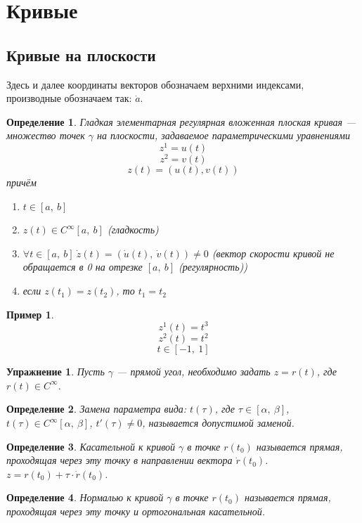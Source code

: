 \documentclass[12pt]{article}
\theoremstyle{plain}
\newtheorem*{exercise}{Упражнение}
\newtheorem{example}{Пример}
\newtheorem{definition}{Определение}[section]
\begin{document}
    \tableofcontents
    \fontsize{14pt}{20pt}\selectfont
    \section{Кривые}
    \subsection{Кривые на плоскости}
    Здесь и далее координаты векторов обозначаем верхними индексами, производные обозначаем так: $\dot{a}$.
    \begin{definition}
        Гладкая элементарная регулярная вложенная плоская кривая --- множество точек $\gamma$ на плоскости, задаваемое параметрическими уравнениями
        $$z^1=u(t)$$
        $$z^2=v(t)$$
        $$z(t)=(u(t),v(t))$$
        причём
        \begin{enumerate}
            \item $t\in[a, \ b]$
            \item $z(t)\in C^{\infty}[a,\ b]$ (гладкость)
            \item $\forall t\in[a, \ b] \ \dot{z}(t)=(\dot{u}(t), \ \dot{v}(t))\neq0$ (вектор скорости кривой не обращается в 0 на отрезке $[a, \ b]$ (регулярность))
            \item если $z(t_1)=z(t_2)$, то $t_1=t_2$
        \end{enumerate}
    \end{definition}
    \begin{example}
        $$z^1(t)=t^3$$
        $$z^2(t)=t^2$$
        $$t\in[-1, \ 1]$$
        
    \end{example}
    \begin{exercise}
        Пусть $\gamma$ --- прямой угол, необходимо задать $z=r(t)$, где $r(t)\in C^{\infty}$.\\
    \end{exercise}
    \begin{definition}
        Замена параметра вида: $t(\tau)$, где $\tau\in[\alpha,\ \beta]$, $t(\tau)\in C^{\infty}[\alpha, \ \beta]$, $t'(\tau)\neq 0$, называется допустимой заменой.
    \end{definition}
    \begin{definition}
        Касательной к кривой $\gamma$ в точке $r(t_0)$ называется прямая, проходящая через эту точку в направлении вектора $\dot{r}(t_0)$. $z=r(t_0)+\tau\cdot\dot{r}(t_0)$.
    \end{definition}
    \begin{definition}
        Нормалью к кривой $\gamma$ в точке $r(t_0)$ называется прямая, проходящая через эту точку и ортогональная касательной.
    \end{definition}
\end{document}
